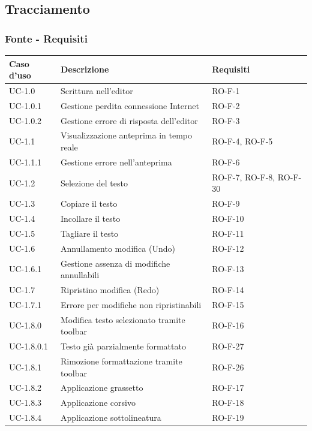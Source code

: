\documentclass[11pt,a4paper]{article}
\begin{document}
\newpage

\subsection{Tracciamento}
\subsubsection{Fonte - Requisiti}
\begin{longtable}{|p{}|p{}|>{\raggedright\arraybackslash}p{}|}
\hline
\textbf{Caso d'uso} & \textbf{Descrizione} & \textbf{Requisiti} \\
\hline
\endhead
UC-1.0 & Scrittura nell'editor & RO-F-1 \\
\hline
UC-1.0.1 & Gestione perdita connessione Internet & RO-F-2 \\
\hline
UC-1.0.2 & Gestione errore di risposta dell'editor & RO-F-3 \\
\hline
UC-1.1 & Visualizzazione anteprima in tempo reale & RO-F-4, RO-F-5 \\
\hline
UC-1.1.1 & Gestione errore nell'anteprima & RO-F-6 \\
\hline
UC-1.2 & Selezione del testo & RO-F-7, RO-F-8, RO-F-30 \\
\hline
UC-1.3 & Copiare il testo & RO-F-9 \\
\hline
UC-1.4 & Incollare il testo & RO-F-10 \\
\hline
UC-1.5 & Tagliare il testo & RO-F-11 \\
\hline
UC-1.6 & Annullamento modifica (Undo) & RO-F-12 \\
\hline
UC-1.6.1 & Gestione assenza di modifiche annullabili & RO-F-13 \\
\hline
UC-1.7 & Ripristino modifica (Redo) & RO-F-14 \\
\hline
UC-1.7.1 & Errore per modifiche non ripristinabili & RO-F-15 \\
\hline
UC-1.8.0 & Modifica testo selezionato tramite toolbar & RO-F-16 \\
\hline
UC-1.8.0.1 & Testo già parzialmente formattato & RO-F-27 \\
\hline
UC-1.8.1 & Rimozione formattazione tramite toolbar & RO-F-26 \\
\hline
UC-1.8.2 & Applicazione grassetto & RO-F-17 \\
\hline
UC-1.8.3 & Applicazione corsivo & RO-F-18 \\
\hline
UC-1.8.4 & Applicazione sottolineatura & RO-F-19 \\

\end{longtable}
\end{document}
